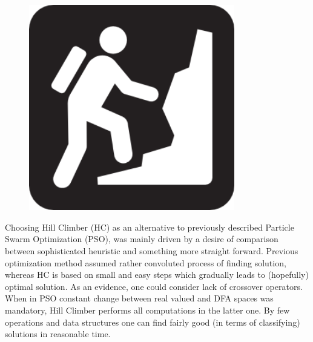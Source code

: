 \documentclass{mini}
\begin{document}
\begin{figure}
    \begin{center}
        \includegraphics[width=0.8\textwidth]{./images/hc_1.png}
    \end{center}
\end{figure}

Choosing Hill Climber (HC) as an alternative to previously described Particle Swarm Optimization (PSO), was mainly driven by a desire of comparison between sophisticated heuristic and something more straight forward. Previous optimization method assumed rather convoluted process of finding solution, whereas HC is based on small and easy steps which gradually leads to (hopefully) optimal solution. As an evidence, one could consider lack of crossover operators. When in PSO constant change between real valued and DFA spaces was mandatory, Hill Climber performs all computations in the latter one. By few operations and data structures one can find fairly good (in terms of classifying) solutions in reasonable time. 
\end{document}
